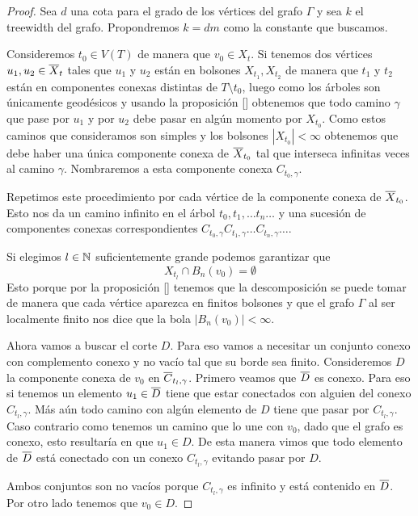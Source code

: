 \documentclass[tesis.tex]{subfiles}
\begin{document}
\begin{proof}
	Sea $d$ una cota para el grado de los vértices del grafo $\Gamma$ y sea $k$ el treewidth del grafo.
	Propondremos $k = dm$ como la constante que buscamos.
	
	Consideremos $t_0 \in V(T)$ de manera que $v_0 \in X_t$.
	Si tenemos dos vértices $u_1,u_2 \in \overline X_t$ tales que $u_1$ y $u_2$ están en bolsones $X_{t_1}, X_{t_2}$ de manera que $t_1$ y $t_2$ están en componentes conexas distintas de $T \setminus t_0$, luego como los árboles son únicamente geodésicos y usando la proposición \ref{} obtenemos que todo camino $\gamma$ que pase por $u_1$ y por $u_2$ debe pasar en algún momento por $X_{{t}_0}$.
	Como estos caminos que consideramos son simples y los bolsones $|X_{t_0}| < \infty$ obtenemos que debe haber una única componente conexa de $\overline X_{t_0}$ tal que interseca infinitas veces al camino $\gamma$.
	Nombraremos a esta componente conexa $C_{t_0,\gamma}$.
	
	Repetimos este procedimiento por cada vértice de la componente conexa de $\overline X_{t_0}$.
	Esto nos da un camino infinito en el árbol $t_0,t_1, \dots t_n \dots$ y una sucesión de componentes conexas correspondientes $C_{t_0,\gamma} C_{t_1,\gamma} \dots C_{t_n, \gamma} \dots$.
	
	Si elegimos $l \in \mathbb{N}$ suficientemente grande podemos garantizar que
	\[
		X_{t_l} \cap B_n(v_0) = \emptyset
	\]
	Esto porque por la proposición \ref{} tenemos que la descomposición se puede tomar de manera que cada vértice aparezca en finitos bolsones y que el grafo $\Gamma$ al ser localmente finito nos dice que la bola $|B_n(v_0)| < \infty$.
	
	Ahora vamos a buscar el corte $D$. 
	Para eso vamos a necesitar un conjunto conexo con complemento conexo y no vacío tal que su borde sea finito.
	Consideremos $D$ la componente conexa de $v_0$ en $\overline C_{t_l, \gamma}$.
	Primero veamos que $\overline D$ es conexo.
	Para eso si tenemos un elemento $u_1 \in \overline D$ tiene que estar conectados con alguien del conexo $C_{t_l, \gamma}$.
	Más aún todo camino con algún elemento de $D$ tiene que pasar por $C_{t_l, \gamma}$.
	Caso contrario como tenemos un camino que lo une con $v_0$, dado que el grafo es conexo, esto resultaría en que $u_1 \in D$.
	De esta manera vimos que todo elemento de $\overline D$ está conectado con un conexo $C_{t_l, \gamma}$ evitando pasar por $D$.
	
	Ambos conjuntos son no vacíos porque $C_{t_l, \gamma}$ es infinito y está contenido en $\overline D$.
	Por otro lado tenemos que $v_0 \in D$.
	

\end{proof}
\end{document}

